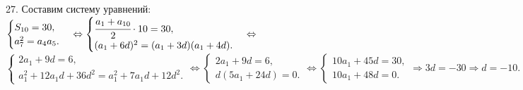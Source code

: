 27. Составим систему уравнений: $\begin{cases}S_{10}=30,\\ a_7^2=a_4a_5.\end{cases}\Leftrightarrow
\begin{cases}\cfrac{a_1+a_{10}}{2}\cdot10=30,\\ (a_1+6d)^2=(a_1+3d)(a_1+4d).\end{cases}\Leftrightarrow$\\$
\begin{cases}2a_1+9d=6,\\ a_1^2+12a_1d+36d^2=a_1^2+7a_1d+12d^2.\end{cases}\Leftrightarrow
\begin{cases}2a_1+9d=6,\\ d(5a_1+24d)=0.\end{cases}\Leftrightarrow
\begin{cases}10a_1+45d=30,\\ 10a_1+48d=0.\end{cases}\Rightarrow
3d=-30\Rightarrow d=-10.$\\
